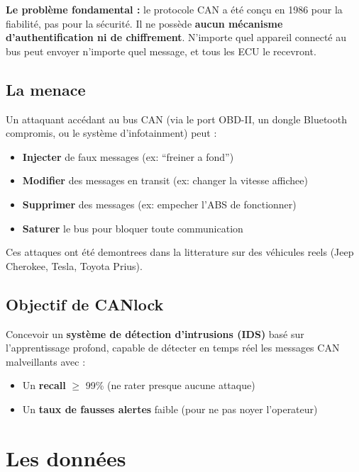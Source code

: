 \documentclass[12pt,a4paper]{article}
\begin{document}
\textbf{Le problème fondamental :} le protocole CAN a été conçu en 1986 pour la fiabilité, pas pour la sécurité. Il ne possède \textbf{aucun mécanisme d'authentification ni de chiffrement}. N'importe quel appareil connecté au bus peut envoyer n'importe quel message, et tous les ECU le recevront.

\subsection{La menace}

Un attaquant accédant au bus CAN (via le port OBD-II, un dongle Bluetooth compromis, ou le système d'infotainment) peut :
\begin{itemize}[noitemsep]
    \item \textbf{Injecter} de faux messages (ex: ``freiner a fond'')
    \item \textbf{Modifier} des messages en transit (ex: changer la vitesse affichee)
    \item \textbf{Supprimer} des messages (ex: empecher l'ABS de fonctionner)
    \item \textbf{Saturer} le bus pour bloquer toute communication
\end{itemize}

Ces attaques ont été demontrees dans la litterature sur des véhicules reels (Jeep Cherokee, Tesla, Toyota Prius).

\subsection{Objectif de CANlock}

\begin{tcolorbox}[colback=navy!5, colframe=navy]
Concevoir un \textbf{système de détection d'intrusions (IDS)} basé sur l'apprentissage profond, capable de détecter en temps réel les messages CAN malveillants avec :
\begin{itemize}[noitemsep]
    \item Un \textbf{recall} $\geq$ 99\% (ne rater presque aucune attaque)
    \item Un \textbf{taux de fausses alertes} faible (pour ne pas noyer l'operateur)
\end{itemize}
\end{tcolorbox}

\section{Les données}
\end{document}
